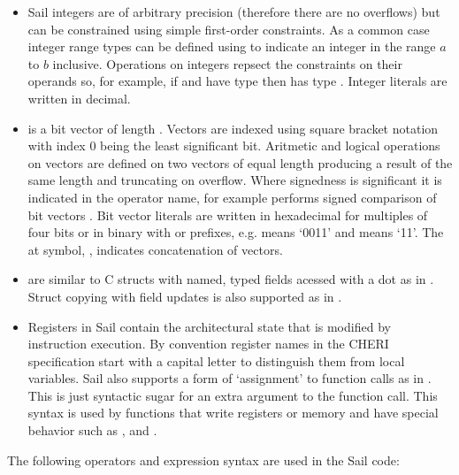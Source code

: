 \label{sailRISCVzbits}
\begin{itemize}
\item {} Sail integers are of arbitrary precision (therefore there are no overflows) but can be constrained using simple first-order constraints. As a common case integer range types can be defined using  to indicate an integer in the range $a$ to $b$ inclusive. Operations on integers repsect the constraints on their operands so, for example, if  and  have type  then  has type . Integer literals are written in decimal.
\item {} \label{zbits} is a bit vector of length . Vectors are indexed using square bracket notation with index 0 being the least significant bit. Aritmetic and logical operations on vectors are defined on two vectors of equal length producing a result of the same length and truncating on overflow. Where signedness is significant it is indicated in the operator name, for example  performs signed comparison of bit vectors . Bit vector literals are written in hexadecimal for multiples of four bits or in binary with  or  prefixes, e.g.  means `0011' and  means `11'. The at symbol, , indicates concatenation of vectors.
\item {} are similar to C structs with named, typed fields acessed with a dot as in . Struct copying with field updates is also supported as in .
\item Registers in Sail contain the architectural state that is modified by instruction execution. By convention register names in the CHERI specification start with a capital letter to distinguish them from local variables. Sail also supports a form of `assignment' to function calls as in . This is just syntactic sugar for an extra argument to the function call. This syntax is used by functions that write registers or memory and have special behavior such as ,  and .
\end{itemize}

The following operators and expression syntax are used in the Sail code:

